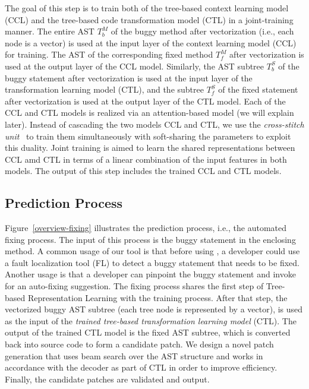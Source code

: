 \vspace{3pt}
The goal of this step is to train both of the tree-based context
learning model (CCL) and the tree-based code transformation model
(CTL) in a joint-training manner. The entire AST $T^{M}_b$ of the
buggy method after vectorization (i.e., each node is a vector) is used
at the input layer of the context learning model (CCL) for
training. The AST of the corresponding fixed method $T^{M}_f$ after
vectorization is used at the output layer of the CCL model. Similarly,
the AST subtree $T^{S}_b$ of the buggy statement after vectorization
is used at the input layer of the transformation learning model (CTL),
and the subtree $T^{S}_f$ of the fixed statement after vectorization
is used at the output layer of the CTL model. Each of the CCL and CTL
models is realized via an attention-based  model (we
will explain later). Instead of cascading the two models CCL and CTL,
we use the {\em cross-stitch unit}~\cite{misra2016cross} to train them
simultaneously with soft-sharing the parameters to exploit this
duality. Joint training is aimed to learn the shared representations
between CCL amd CTL in terms of a linear combination of the input
features in both models. The output of this step includes the trained
CCL and CTL models.

\subsection{Prediction Process}



Figure~\ref{overview-fixing} illustrates the prediction process, i.e.,
the automated fixing process. The input of this process is the buggy
statement in the enclosing method. A common usage of our tool is that
before using {\tool}, a developer could use a fault localization tool
(FL) to detect a buggy statement that needs to be fixed. Another usage
is that a developer can pinpoint the buggy statement and invoke
{\tool} for an auto-fixing suggestion. The fixing process shares the
first step of Tree-based Representation Learning with the training
process. After that step, the vectorized buggy AST subtree (each tree
node is represented by a vector), is used as the input of the {\em
  trained tree-based transformation learning model} (CTL). The output
of the trained CTL model is the fixed AST subtree, which is converted
back into source code to form a candidate patch. We design a novel
patch generation that uses beam search over the AST structure and
works in accordance with the decoder as part of CTL in order to
improve efficiency. Finally, the candidate patches are validated and
output.

